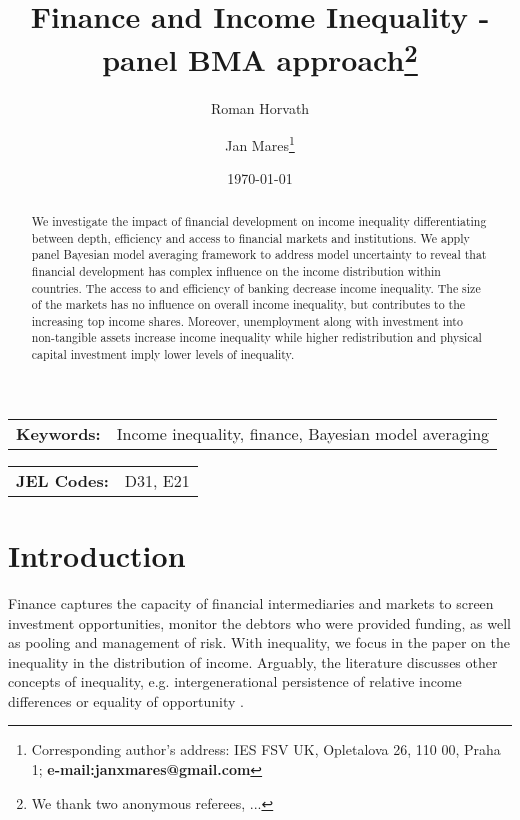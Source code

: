 \documentclass[a4paper,11pt]{article}
\title{Finance and Income Inequality - panel BMA approach\thanks{We thank two anonymous referees, ...}}
\author[a]{Roman Horvath}
\author[a]{Jan Mares\footnote{\footnotesize Corresponding author's address: IES FSV UK, Opletalova 26, 110 00, Praha 1; \textbf{e-mail:janxmares@gmail.com}}}
\affil[a]{Charles University, Prague}
\date{\today}
\begin{document}
\def\sym#1{\ifmmode^{#1}\else\(^{#1}\)\fi} %

\maketitle

\thispagestyle{empty}
\begin{abstract}
    We investigate the impact of financial development on income inequality differentiating between depth, efficiency and access to financial markets and institutions. We apply panel Bayesian model averaging framework to address model uncertainty to reveal that financial development has complex influence on the income distribution within countries. The access to and efficiency of banking decrease income inequality. The size of the markets has no influence on overall income inequality, but contributes to the increasing top income shares. Moreover, unemployment along with investment into non-tangible assets increase income inequality while higher redistribution and physical capital investment imply lower levels of inequality.
\end{abstract}

\bigskip

\begin{tabular}{p{0.25\hsize}p{0.6\hsize}} %
\textbf{Keywords:} & Income inequality, finance, Bayesian model averaging
\end{tabular}

\bigskip

\begin{tabular}{p{0.25\hsize}p{0.6\hsize}}
\textbf{JEL Codes:} & D31, E21\\
\end{tabular}

\clearpage
\setcounter{page}{1}

\section{Introduction}

Finance captures the capacity of financial intermediaries and markets to screen investment opportunities, monitor the debtors who were provided funding, as well as pooling and management of risk. With inequality, we focus in the paper on the inequality in the distribution of income. Arguably, the literature discusses other concepts of inequality, e.g. intergenerational persistence of relative income differences or equality of opportunity \citep{demirgucc2009finance}.
\end{document}
